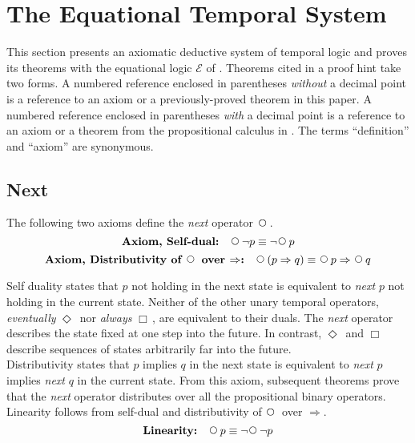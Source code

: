 \documentclass[fleqn, leqno]{article}
\newcommand{\impl}{\ensuremath{\Rightarrow}}        %
\newcommand{\Next}{\;\,\text{\raisebox{3.5pt}{\circle{6}}}}
\newcommand{\Event}{\Diamond\,}
\newcommand{\Always}{\Box\,}
\begin{document}
\section{The Equational Temporal System}

This section presents an axiomatic deductive system of temporal logic and proves its theorems with the equational
logic $\mathcal{E}$ of \cite{LADM}.
Theorems cited in a proof hint take two forms.
A numbered reference enclosed in parentheses \textit{without} a decimal point is a reference to an axiom or a previously-proved
theorem in this paper.
A numbered reference enclosed in parentheses \textit{with} a decimal point is a reference to an axiom or a
theorem from the propositional calculus in \cite{LADM}.
The terms ``definition'' and ``axiom'' are synonymous.\\

\subsection{Next}

The following two axioms define the \textit{next} operator $\Next$.
\begin{equation}\label{E:selfDual}
\textbf{Axiom, Self-dual:}\quad \Next\neg p \equiv \neg\Next p
\end{equation}
\begin{equation}\label{E:distNextImp}
\textbf{Axiom, Distributivity of $\Next$ over $\impl$:}\quad \Next (p \impl q) \equiv \Next p \impl \Next q
\end{equation}

Self duality states that $p$ not holding in the next state is equivalent to \textit{next} $p$ not holding in the current state.
Neither of the other unary temporal operators, \textit{eventually} $\Event$ nor \textit{always} $\Always$, are equivalent to their duals.
The \textit{next} operator describes the state fixed at one step into the future.
In contrast, $\Event$ and $\Always$ describe sequences of states arbitrarily far into the future.\\

Distributivity states that $p$ implies $q$ in the next state is equivalent to \textit{next} $p$ implies \textit{next} $q$ in the current state.
From this axiom, subsequent theorems prove that the \textit{next} operator distributes over all the propositional binary operators.\\

Linearity follows from self-dual and distributivity of $\Next$ over $\impl$.
\begin{equation}\label{E:linearity}
\textbf{Linearity:}\quad \Next p \equiv \neg\Next\neg p
\end{equation}
\end{document}

